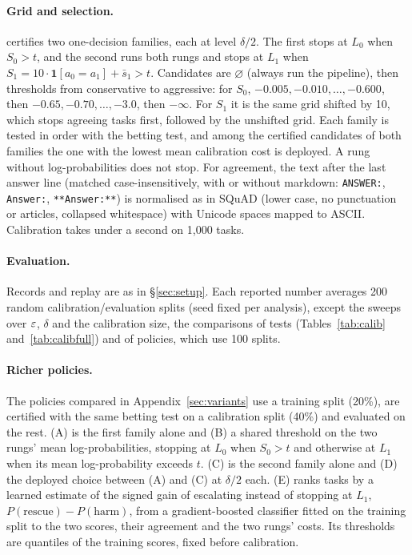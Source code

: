 \paragraph{Grid and selection.} \climb{} certifies two one-decision families, each at level $\delta/2$.
The first stops at $L_0$ when $S_0 > t$, and the second runs both rungs and stops at $L_1$ when
$S_1 = 10\cdot\mathbf{1}[a_0 = a_1] + \bar s_1 > t$. Candidates are $\varnothing$ (always run the pipeline),
then thresholds from conservative to aggressive: for $S_0$, $-0.005, -0.010, \dots, -0.600$, then
$-0.65, -0.70, \dots, -3.0$, then $-\infty$. For $S_1$ it is the same grid shifted by 10, which stops agreeing
tasks first, followed by the unshifted grid. Each family is tested in order with the betting test, and among
the certified candidates of both families the one with the lowest mean calibration cost is deployed. A rung
without log-probabilities does not stop. For agreement, the text after the last answer line (matched case-insensitively, with or without
markdown: \texttt{ANSWER:}, \texttt{Answer:}, \texttt{**Answer:**}) is normalised as in SQuAD (lower case, no punctuation or articles, collapsed
whitespace) with Unicode spaces mapped to ASCII. Calibration
takes under a second on 1{,}000 tasks.

\paragraph{Evaluation.} Records and replay are as in \S\ref{sec:setup}. Each reported number averages 200
random calibration/evaluation splits (seed fixed per analysis), except the sweeps over $\varepsilon$, $\delta$ and the calibration size, the
comparisons of tests (Tables~\ref{tab:calib} and~\ref{tab:calibfull}) and of policies, which use 100 splits.

\paragraph{Richer policies.} The policies compared in Appendix~\ref{sec:variants} use a training split (20\%), are
certified with the same betting test on a calibration split (40\%) and evaluated on the rest. (A) is the
first family alone and (B) a shared threshold on the two rungs' mean log-probabilities, stopping at $L_0$
when $S_0 > t$ and otherwise at $L_1$ when its mean log-probability exceeds $t$. (C) is the second family
alone and (D) the deployed choice between (A) and (C) at $\delta/2$ each. (E) ranks tasks by a learned
estimate of the signed gain of escalating instead of stopping at $L_1$, $P(\text{rescue}) -
P(\text{harm})$, from a gradient-boosted classifier fitted on the training split to the two scores, their
agreement and the two rungs' costs. Its thresholds are quantiles of the training scores, fixed before
calibration.


